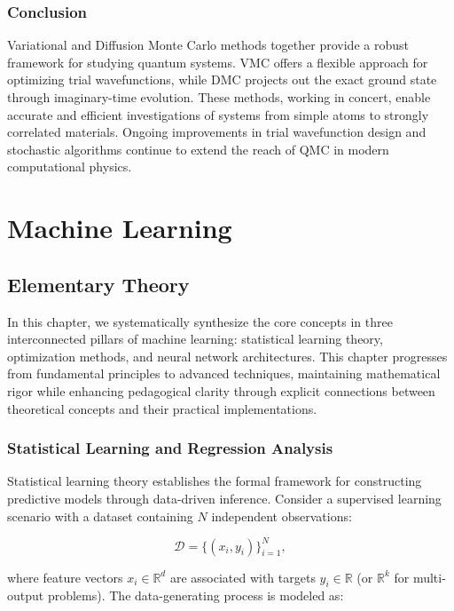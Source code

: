 \subsection{Conclusion}
Variational and Diffusion Monte Carlo methods together provide a robust framework for studying quantum systems. VMC offers a flexible approach for optimizing trial wavefunctions, while DMC projects out the exact ground state through imaginary-time evolution. These methods, working in concert, enable accurate and efficient investigations of systems from simple atoms to strongly correlated materials. Ongoing improvements in trial wavefunction design and stochastic algorithms continue to extend the reach of QMC in modern computational physics.

\chapter{Machine Learning}
\label{sec:theory}

\section{Elementary Theory}
\label{sec:ml_concepts}

In this chapter, we systematically synthesize the core concepts in three interconnected pillars of machine learning: statistical learning theory, optimization methods, and neural network architectures. This chapter progresses from fundamental principles to advanced techniques, maintaining mathematical rigor while enhancing pedagogical clarity through explicit connections between theoretical concepts and their practical implementations.

\subsection{Statistical Learning and Regression Analysis}
\label{subsec:stat_learning}

Statistical learning theory establishes the formal framework for constructing predictive models through data-driven inference. Consider a supervised learning scenario with a dataset containing $N$ independent observations:

\[
\mathcal{D} = \{(x_i, y_i)\}_{i=1}^{N},
\]

where feature vectors $x_i \in \mathbb{R}^{d}$ are associated with targets $y_i \in \mathbb{R}$ (or $\mathbb{R}^k$ for multi-output problems). The data-generating process is modeled as:

